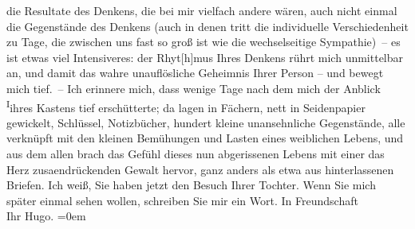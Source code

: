 \begin{ledgroupsized}[t]{13cm}
                    die Resultate des Denkens, die bei mir vielfach andere wären, auch nicht einmal
                    die Gegenstände des Denkens (auch in denen tritt die individuelle
                    Verschiedenheit zu Tage, die zwischen uns fast so groß ist wie die
                    wechselseitige Sympathie) – {\pb}es ist etwas viel Intensiveres: der Rhyt{[}h{]}mus Ihres
                    Denkens rührt mich unmittelbar an, und damit das wahre unauflösliche Geheimnis
                    Ihrer Person – und bewegt mich tief. – Ich erinnere mich, dass wenige Tage nach
                    dem \label{K_L02496_1v}\label{K_L02496_1h} mich der Anblick \substVorne{}\textsuperscript{I}\substDazwischen{}i\substHinten{}hres Kastens tief erschütterte; da lagen in Fächern, nett in
                    Seidenpapier gewickelt, Schlüssel, Notizbücher, hundert kleine unansehnliche
                    Gegenstände, alle verknüpft mit den kleinen Bemühungen und Lasten eines
                    weiblichen Lebens, und aus dem allen brach das Gefühl dieses nun abgerissenen
                    Lebens mit einer das Herz zusa{\geminationm}endrückenden Gewalt
                    hervor, ganz anders als etwa aus hinterlassenen Briefen.\pend
           \pstart
           Ich weiß, Sie haben jetzt den Besuch Ihrer Tochter. Wenn Sie mich später einmal sehen wollen,
                    schreiben Sie mir ein Wort.\pend
           \pstart
           In Freundschaft{\\[\baselineskip]}Ihr \spacefill\mbox{Hugo.}\pend
           \leftskip=0em{}
         
         \endnumbering{}\end{ledgroupsized}  \newcommand{\dateiname}{L02496}\newcommand{\titel}{Hugo Hofmannsthal an Arthur Schnitzler, 29. 12. 1927}\newcommand{\editorInnen}{Martin Anton Müller und Gerd-Hermann Susen}
      